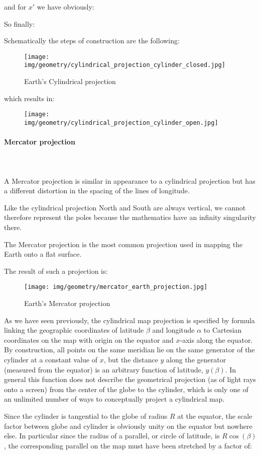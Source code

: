 	and for $x'$ we have obviously:
	
	So finally:
	
	Schematically the steps of construction are the following:
	\begin{figure}[H]
		\centering
		\texttt{[image: img/geometry/cylindrical\_projection\_cylinder\_closed.jpg]}
		\caption{Earth's Cylindrical projection}
	\end{figure}
	which results in:
	\begin{figure}[H]
		\centering
		\texttt{[image: img/geometry/cylindrical\_projection\_cylinder\_open.jpg]}
	\end{figure}
	
	\paragraph{Mercator projection}\mbox{}\\\\
	A Mercator projection is similar in appearance to a cylindrical projection but has a different distortion in the spacing of the lines of longitude. 

	Like the cylindrical projection North and South are always vertical, we cannot therefore represent the poles because the mathematics have an infinity singularity there.

	The Mercator projection is the most common projection used in mapping the Earth onto a flat surface. 
	
	The result of such a projection is:
	\begin{figure}[H]
		\centering
		\texttt{[image: img/geometry/mercator\_earth\_projection.jpg]}
		\caption{Earth's Mercator projection}
	\end{figure}
	As we have seen previously, the cylindrical map projection is specified by formula linking the geographic coordinates of latitude $\beta$ and longitude $\alpha$ to Cartesian coordinates on the map with origin on the equator and $x$-axis along the equator. By construction, all points on the same meridian lie on the same generator of the cylinder at a constant value of $x$, but the distance $y$ along the generator (measured from the equator) is an arbitrary function of latitude, $y(\beta)$. In general this function does not describe the geometrical projection (as of light rays onto a screen) from the center of the globe to the cylinder, which is only one of an unlimited number of ways to conceptually project a cylindrical map.
	
	Since the cylinder is tangential to the globe of radius $R$ at the equator, the scale factor between globe and cylinder is obviously unity on the equator but nowhere else. In particular since the radius of a parallel, or circle of latitude, is $R\cos(\beta)$, the corresponding parallel on the map must have been stretched by a factor of:
	
